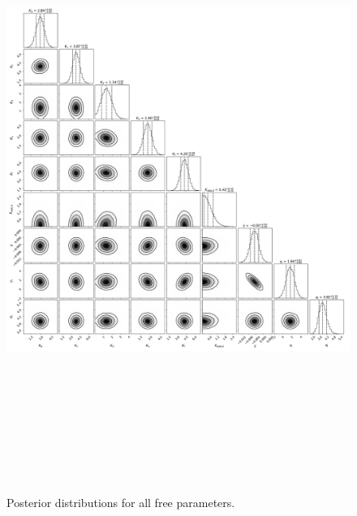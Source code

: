 \documentclass{emulateapj}
\begin{document}
 
\begin{figure}[!h]
\centering

\includegraphics[height=8.0in,width=6.0in,keepaspectratio]{TOI-1246_add_cd_corner.pdf}
\caption{Posterior distributions for all free parameters.}
\end{figure} 

 
\end{document}
